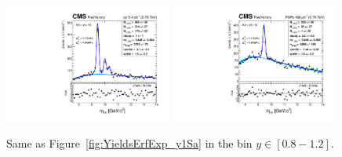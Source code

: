 \begin{figure}
  \includegraphics[width=0.49\textwidth]{Chapters/aYield/pp/pt_3p5_4/Rap/Rap_0p8_1p2/pp2p76tev_Rap_0p8_1p2_fsr1.pdf}
  \includegraphics[width=0.49\textwidth]{Chapters/aYield/PbPb/pt_3p5_4/Rap/Rap_0p8_1p2/PbPb_Rap_0p8_1p2_fsr1.pdf}  
 \caption{Same as Figure~\ref{fig:YieldsErfExp_y1Sa} in the bin $y\in [0.8 - 1.2]$.}
  \label{fig:YieldsErfExp_y1Sc} 
\end{figure}

